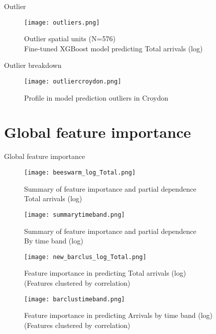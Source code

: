 Outlier

\begin{figure}[ht]
    \centering
    \texttt{[image: outliers.png]}
    \captionsetup{justification=centering}
    \caption{Outlier spatial units (N=576)\\Fine-tuned XGBoost model predicting Total arrivals (log)}
    \label{fig:outliers}
\end{figure}

Outlier breakdown

\begin{figure}[ht]
    \centering
    \texttt{[image: outliercroydon.png]}
    \captionsetup{justification=centering}
    \caption{Profile in model prediction outliers in Croydon}
    \label{fig:outliercroydon}
\end{figure}


\section{Global feature importance}

Global feature importance

\begin{figure}[!ht]
    \centering
    \texttt{[image: beeswarm\_log\_Total.png]}
    \captionsetup{justification=centering}
    \caption{Summary of feature importance and partial dependence\\Total arrivals (log)}
    \label{fig:beeswarmtotal}
\end{figure}

\begin{figure}[!ht]
    \centering
    \texttt{[image: summarytimeband.png]}
    \captionsetup{justification=centering}
    \caption{Summary of feature importance and partial dependence\\By time band (log)}
    \label{fig:beeswarmtimeband}
\end{figure}

\begin{figure}[!ht]
    \centering
    \texttt{[image: new\_barclus\_log\_Total.png]}
    \captionsetup{justification=centering}
    \caption{Feature importance in predicting Total arrivals (log) \\ (Features clustered by correlation)}
    \label{fig:barclustertotal}
\end{figure}

\begin{figure}[!ht]
    \centering
    \texttt{[image: barclustimeband.png]}
    \captionsetup{justification=centering}
    \caption{Feature importance in predicting Arrivals by time band (log) \\ (Features clustered by correlation)}
    \label{fig:barclustertimeband}
\end{figure}

